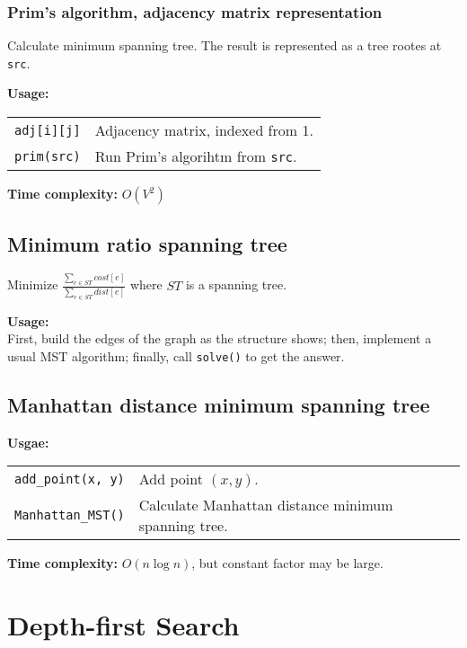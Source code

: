 \subsubsection{Prim's algorithm, adjacency matrix representation}
Calculate minimum spanning tree. The result is represented as a tree rootes at \lstinline|src|. \par
\textbf{Usage:} \\[0.1cm]
\begin{tabular}{p{2.5cm} p{9cm}}
  \lstinline|adj[i][j]| & Adjacency matrix, indexed from 1. \\
  \lstinline|prim(src)| & Run Prim's algorihtm from \lstinline|src|. \\
\end{tabular} \par
\textbf{Time complexity:} $O(V^2)$ \par


\subsection{Minimum ratio spanning tree}
Minimize $\frac{\sum_{e \in ST} cost[e]}{\sum_{e \in ST} dist[e]}$ where $ST$ is a spanning tree. \par
\textbf{Usage:} \\[0.1cm]
First, build the edges of the graph as the structure shows; then, implement a usual MST algorithm; finally, call \lstinline|solve()| to get the answer. \par


\subsection{Manhattan distance minimum spanning tree}
\textbf{Usgae:} \\[0.1cm]
\begin{tabular}{p{3cm} p{9cm}}
  \lstinline|add_point(x, y)| & Add point $(x, y)$. \\
  \lstinline|Manhattan_MST()| & Calculate Manhattan distance minimum spanning tree.
\end{tabular} \par
\textbf{Time complexity:} $O(n \log n)$, but constant factor may be large. \par


\section{Depth-first Search}
